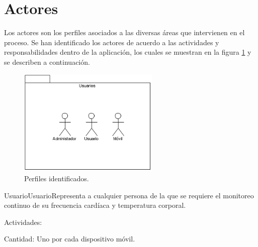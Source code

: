 \section{Actores}

Los actores son los perfiles asociados a las diversas áreas que intervienen en el proceso. Se han identificado los actores de acuerdo a las actividades y responsabilidades dentro de la aplicación, los cuales se muestran en la figura \ref{fig:perfiles} y se describen a continuación.


    \begin{figure}[htbp!]
      \begin{center}
      \includegraphics[width=0.6\textwidth]{ModeloComportamiento/imagenes/Actores.png}
      \caption{Perfiles identificados.}
      \label{fig:perfiles}
      \end{center}
    \end{figure}

\begin{actor}{Usuario}{Usuario}{Representa a cualquier persona de la que se requiere el monitoreo continuo de su frecuencia cardíaca y temperatura corporal.}
	\item[Actividades:]
	\item[Cantidad:] Uno por cada dispositivo móvil.

\end{actor}

